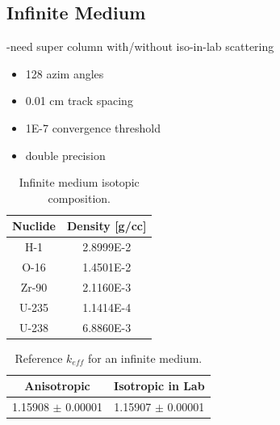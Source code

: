 \subsection{Infinite Medium}
\label{subsec:chap4-inf-medium}

-need super column with/without iso-in-lab scattering

\begin{itemize}[noitemsep]
\item 128 azim angles
\item 0.01 cm track spacing
\item 1E-7 convergence threshold
\item double precision
\end{itemize}

\begin{table}[h!]
  \centering
  \caption{Infinite medium isotopic composition.}
  \label{table:chap2-inf-med-isotopes} 
  \vspace{14pt}
  \begin{tabular}{c c}
  \toprule
  \multicolumn{1}{c}{\bf Nuclide} &
  \multicolumn{1}{c}{\bf Density [g/cc]} \\
  \midrule
  H-1 & 2.8999E-2 \\
  O-16 & 1.4501E-2 \\
  Zr-90 & 2.1160E-3 \\  
  U-235 & 1.1414E-4 \\
  U-238 & 6.8860E-3 \\
  \bottomrule
\end{tabular}
\end{table}

\begin{table}[h!]
  \centering
  \caption{Reference $k_{eff}$ for an infinite medium.}
  \label{table:chap2-inf-med-reference} 
  \vspace{14pt}
  \begin{tabular}{c c}
  \toprule
  \multicolumn{1}{c}{\bf Anisotropic} &
  \multicolumn{1}{c}{\bf Isotropic in Lab} \\
  \midrule
  1.15908 $\pm$ 0.00001 & 1.15907 $\pm$ 0.00001 \\
  \bottomrule
\end{tabular}
\end{table}


